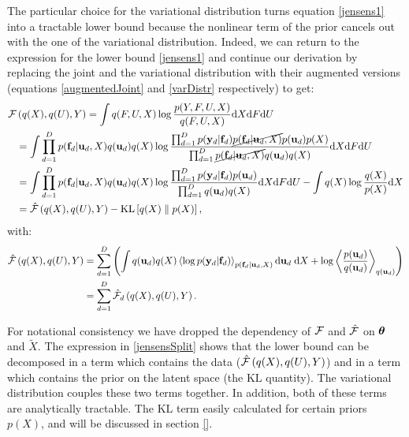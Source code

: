 \par The particular choice for the variational distribution
turns equation \eqref{jensens1} into a tractable
lower bound because the nonlinear term of the prior cancels
out with the one of the variational distribution.
Indeed, we can return to
the expression for the lower bound \eqref{jensens1} and
continue our derivation by replacing the joint and the
variational distribution with their augmented versions
(equations \eqref{augmentedJoint} and \eqref{varDistr} respectively) to get:
\begin{align}
\mathcal{F} & \left( q(X), q(U), Y \right) = \int q(F,U,X) \log 
		\frac{ p(Y,F, U,X)}
			 {q(F, U,X)}  \text{d}  X \text{d} F \text{d} U
 	    \nonumber \\
 & = \int \prod_{d=1}^D p(\mathbf{f}_d | \mathbf{u}_d, X )q(\mathbf{u}_d) q(X) 
	    \log  \frac{\prod_{d=1}^D p(\mathbf{y}_d | \mathbf{f}_d) \cancel{p(\mathbf{f}_d | \mathbf{u}_d, X)}
						p(\mathbf{u}_d)  p(X )}
 	      		   {\prod_{d=1}^D \cancel{p(\mathbf{f}_d | \mathbf{u}_d, X )}q(\mathbf{u}_d) q(X)}   \text{d}  X \text{d} F  \text{d} U \nonumber \\
 & = \int \prod_{d=1}^D p(\mathbf{f}_d | \mathbf{u}_d, X )q(\mathbf{u}_d) q(X) 
		\log  \frac{\prod_{d=1}^D p(\mathbf{y}_d | \mathbf{f}_d) p(\mathbf{u}_d)}
				   {\prod_{d=1}^D q(\mathbf{u}_d) q(X)}   \text{d}  X \text{d} F  \text{d} U
-  \int  q(X)   \log \frac{q(X)}{p(X )}   \text{d}  X \nonumber \\
 & = \hat{\mathcal{F}}\left( q(X), q(U), Y \right) - \text{KL} \left[ q(X) \parallel p(X) \right], \label{jensensSplit}
\end{align}
%
with:
 \begin{align}
\hat{\mathcal{F}} \left( q(X), q(U), Y \right) 
&= 
\sum_{d=1}^D \left( 
    \int q(\mathbf{u}_d) q(X) \left\langle \log p(\mathbf{y}_d | \mathbf{f}_d) \right\rangle_{p(\mathbf{f}_d | \mathbf{u}_d, X)} \text{d} \mathbf{u}_d \; \text{d} X +
					   \log \left\langle \frac{p(\mathbf{u}_d)}{q(\mathbf{u}_d)} \right\rangle_{q(\mathbf{u}_d)} 
  \right) \nonumber \\
  &= \sum_{d=1}^D \hat{\mathcal{F}}_d \left( q(X), q(U), Y \right) . \label{Fd}
\end{align} 

For notational consistency we have dropped the dependency of $\mathcal{F}$ and $\hat{\mathcal{F}}$
on $\boldsymbol \theta$ and $\tilde{X}$.
The expression in \eqref{jensensSplit} shows that the lower bound can be decomposed in a term which contains
the data ($\hat{\mathcal{F}} \left( q(X), q(U), Y \right)$) and in a term which contains the prior on the latent space
(the $\text{KL}$ quantity). The variational distribution couples these two terms together. In addition,
both of these terms are analytically tractable. The $\text{KL}$ term
easily calculated for certain priors $p(X)$, and will be discussed in section \ref{}.

